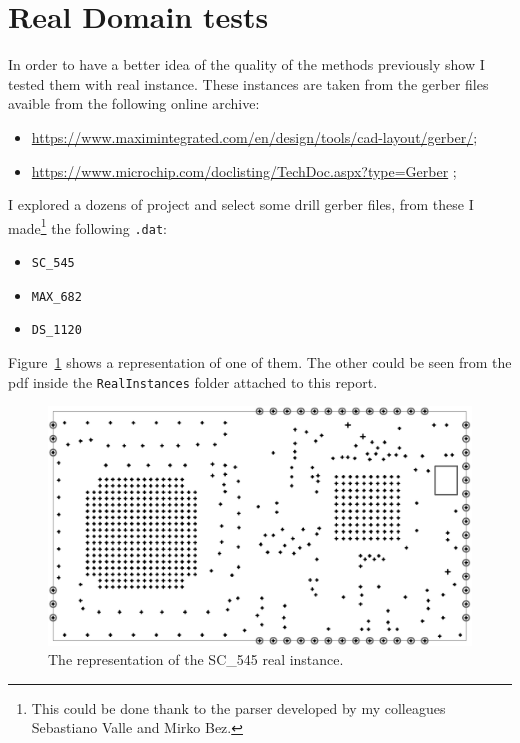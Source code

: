 \section{Real Domain tests}
\label{sec:realDomainTests}
	In order to have a better idea of the quality of the methods previously show I tested them with real instance. These instances are taken from the gerber files avaible from the following online archive:
	\begin{itemize}
		\item \href{https://www.maximintegrated.com/en/design/tools/cad-layout/gerber/}{https://www.maximintegrated.com/en/design/tools/cad-layout/gerber/};
		\item \href{https://www.microchip.com/doclisting/TechDoc.aspx?type=Gerber}{https://www.microchip.com/doclisting/TechDoc.aspx?type=Gerber} ;
	\end{itemize}

	I explored a dozens of project and select some drill gerber files, from these I made\footnote{This could be done thank to the parser developed by my colleagues Sebastiano Valle and Mirko Bez.} the following \verb|.dat|:
	
	\begin{itemize}
		\item \verb|SC_545|
		\item \verb|MAX_682|
		\item \verb|DS_1120|
	\end{itemize}
	Figure~\ref{fig:SC_545} shows a representation of one of them. The other could be seen from the pdf inside the \verb|RealInstances| folder attached to this report.

	\begin{figure}
		\centering
		\includegraphics[width=\textwidth]{img/SC_545}
		\caption{The representation of the SC\_545 real instance.}
		\label{fig:SC_545}
	\end{figure}
	
